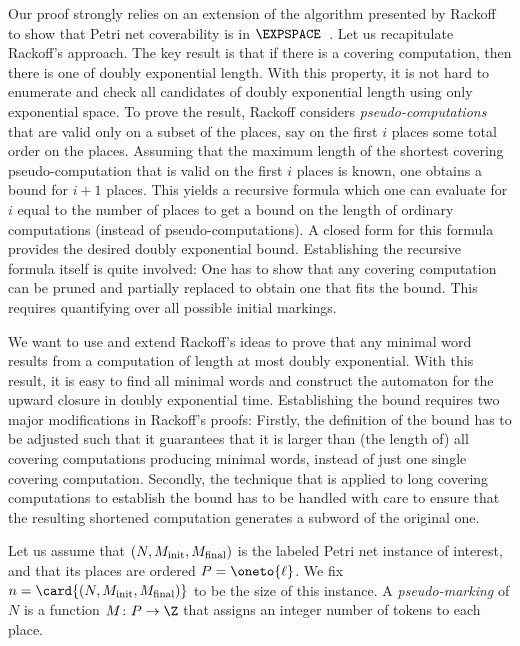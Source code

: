 \documentclass[../../diss.tex]{subfiles}
\begin{document}
Our proof strongly relies on an extension of the algorithm presented by Rackoff to show that Petri net coverability is in $\EXPSPACE$~\cite{Rackoff78}.
Let us recapitulate Rackoff's approach.
The key result is that if there is a covering computation, then there is one of doubly exponential length.
With this property, it is not hard to enumerate and check all candidates of doubly exponential length using only exponential space.
To prove the result, Rackoff considers \emph{pseudo-computations} that are valid only on a subset of the places, say on the first $i$ places \wrt some total order on the places.
Assuming that the maximum length of the shortest covering pseudo-computation that is valid on the first $i$ places is known, one obtains a bound for $i+1$ places.
This yields a recursive formula which one can evaluate for $i$ equal to the number of places to get a bound on the length of ordinary computations (instead of pseudo-computations).
A closed form for this formula provides the desired doubly exponential bound.
Establishing the recursive formula itself is quite involved:
One has to show that any covering computation can be pruned and partially replaced to obtain one that fits the bound.
This requires quantifying over all possible initial markings.

We want to use and extend Rackoff's ideas to prove that any minimal word results from a computation of length at most doubly exponential.
With this result, it is easy to find all minimal words and construct the automaton for the upward closure in doubly exponential time.
Establishing the bound requires two major modifications in Rackoff's proofs:
Firstly, the definition of the bound has to be adjusted such that it guarantees that it is larger than (the length of) all covering computations producing minimal words, instead of just one single covering computation.
Secondly, the technique that is applied to long covering computations to establish the bound has to be handled with care to ensure that the resulting shortened computation generates a subword of the original one.

Let us assume that $(N,M_{\text{init}},M_{\text{final}})$ is the labeled Petri net instance of interest, and that its places are ordered \ie $P = \oneto{\ell}$.
We fix $n = \card{(N,\Minit,\Mfinal)}$ to be the size of this instance.
A \emph{pseudo-marking} of $N$ is a function $M \colon P \rightarrow \Z$ that assigns an integer number of tokens to each place.
\end{document}
